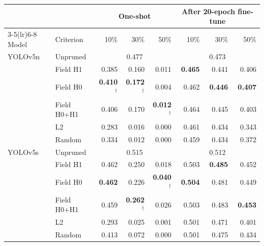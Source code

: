 \begin{tabular}{llrrrrrr}
\toprule
 & & \multicolumn{3}{c}{One-shot} & \multicolumn{3}{c}{After 20-epoch fine-tune} \\
\cmidrule(lr){3-5}\cmidrule(lr){6-8}
Model & Criterion & 10\% & 30\% & 50\% & 10\% & 30\% & 50\% \\
\midrule
YOLOv5n & Unpruned & \multicolumn{3}{c}{0.477} & \multicolumn{3}{c}{0.473} \\
 & Field H1 & 0.385 & 0.160 & 0.011 & \textbf{0.465} & 0.441 & 0.406 \\
 & Field H0 & \textbf{0.410}$^\dagger$ & \textbf{0.172}$^\dagger$ & 0.004 & 0.462 & \textbf{0.446} & \textbf{0.407} \\
 & Field H0+H1 & 0.406 & 0.170 & \textbf{0.012}$^\dagger$ & 0.464 & 0.445 & 0.403 \\
 & L2 & 0.283 & 0.016 & 0.000 & 0.461 & 0.434 & 0.343 \\
 & Random & 0.334 & 0.012 & 0.000 & 0.459 & 0.434 & 0.372 \\
\midrule
YOLOv5s & Unpruned & \multicolumn{3}{c}{0.515} & \multicolumn{3}{c}{0.512} \\
 & Field H1 & 0.462 & 0.250 & 0.018 & 0.503 & \textbf{0.485} & 0.452 \\
 & Field H0 & \textbf{0.462} & 0.226 & \textbf{0.040}$^\dagger$ & \textbf{0.504} & 0.481 & 0.449 \\
 & Field H0+H1 & 0.459 & \textbf{0.262}$^\dagger$ & 0.026 & 0.503 & 0.483 & \textbf{0.453} \\
 & L2 & 0.293 & 0.025 & 0.001 & 0.501 & 0.471 & 0.401 \\
 & Random & 0.413 & 0.072 & 0.000 & 0.501 & 0.475 & 0.434 \\
\bottomrule
\end{tabular}
